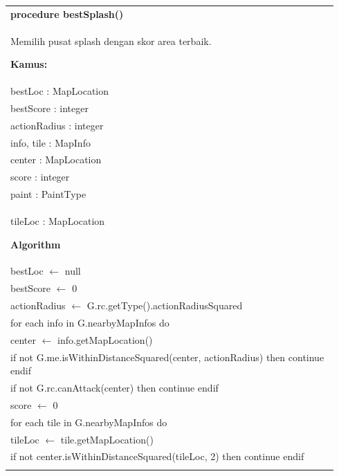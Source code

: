 \documentclass{article}
\newenvironment{pseudobox}
{
\centering
\begin{longtable}{|p{0.94\linewidth}|}
\hline
}
{
\\ \hline
\end{longtable}
\vspace{0.05cm}
}
\begin{document}
\begin{pseudobox}
\textbf{procedure bestSplash()} \\
{ Memilih pusat splash dengan skor area terbaik. }

\textbf{Kamus:} \\
\hspace*{1em} bestLoc : MapLocation \\
\hspace*{1em} bestScore : integer \\
\hspace*{1em} actionRadius : integer \\
\hspace*{1em} info, tile : MapInfo \\
\hspace*{1em} center : MapLocation \\
\hspace*{1em} score : integer \\
\hspace*{1em} paint : PaintType \\
\hspace*{1em} tileLoc : MapLocation

\textbf{Algorithm} \\
\hspace*{1em} bestLoc $\leftarrow$ null \\
\hspace*{1em} bestScore $\leftarrow$ 0 \\
\hspace*{1em} actionRadius $\leftarrow$ G.rc.getType().actionRadiusSquared \\

\hspace*{1em} for each info in G.nearbyMapInfos do \\
\hspace*{2em} center $\leftarrow$ info.getMapLocation() \\
\hspace*{2em} if not G.me.isWithinDistanceSquared(center, actionRadius) then continue endif \\
\hspace*{2em} if not G.rc.canAttack(center) then continue endif \\

\hspace*{2em} score $\leftarrow$ 0 \\

\hspace*{2em} for each tile in G.nearbyMapInfos do \\
\hspace*{3em} tileLoc $\leftarrow$ tile.getMapLocation() \\
\hspace*{3em} if not center.isWithinDistanceSquared(tileLoc, 2) then continue endif \\


\end{pseudobox}
\end{document}
